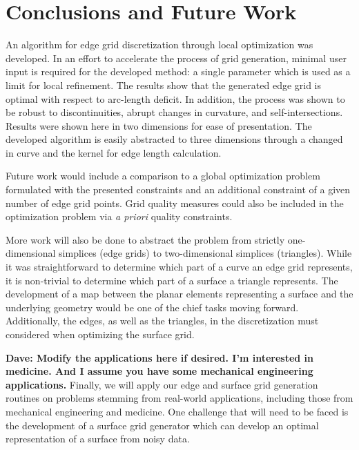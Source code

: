 \section{Conclusions and Future Work}
An algorithm for edge grid discretization through local optimization was 
developed. In an effort to accelerate the process of grid generation, 
minimal user input is required for the developed method: a single 
parameter which is used as a limit for local refinement. The results show 
that the generated edge grid is optimal with respect to arc-length 
deficit. In addition, the process was shown to be robust to 
discontinuities, abrupt changes in curvature, and self-intersections. 
Results were shown here in two dimensions for ease of presentation. The 
developed algorithm is easily abstracted to three dimensions through a 
changed in curve and the kernel for edge length calculation.

Future work would include a comparison to a global optimization problem 
formulated with the presented constraints and an additional constraint of 
a given number of edge grid points. Grid quality measures could also be 
included in the optimization problem via {\it a priori} quality 
constraints.

More work will also be done to abstract the problem from strictly 
one-dimensional simplices (edge grids) to two-dimensional simplices 
(triangles). While it was straightforward to determine which part of a 
curve an edge grid represents, it is non-trivial to determine which part 
of a surface a triangle represents. The development of a map between the 
planar elements representing a surface and the underlying geometry would 
be one of the chief tasks moving forward. Additionally, the edges, as well 
as the triangles, in the discretization must considered when optimizing 
the surface grid.

{\bf{Dave:  Modify the applications here if desired.  I'm interested in 
medicine.  And I assume you have some mechanical engineering 
applications.}}
Finally, we will apply our edge and surface grid generation routines on 
problems stemming from real-world applications, including those from 
mechanical engineering and medicine.  One challenge that will need to be 
faced is the development of a surface grid generator which can develop 
an optimal representation of a surface from noisy data.

